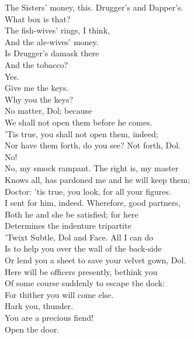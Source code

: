 \documentclass[a4paper,oneside,12pt]{memoir}
\begin{document}
\begin{drama*}
The Sisters' money, this. Drugger's and Dapper's.\\
What box is that?\\
\subtlespeaks {} The fish-wives' rings, I think,\\
And the ale-wives' money.\\
\facespeaks {} Is Drugger's damask there\\
And the tobacco?\\
\subtlespeaks {} Yes.\\
\facespeaks {} Give me the keys.\\
\dolspeaks Why you the keys?\\
\subtlespeaks {} No matter, Dol; because\\
We shall not open them before he comes.\\
\facespeaks 'Tis true, you shall not open them, indeed;\\
Nor have them forth, do you see? Not forth, Dol.\\
\dolspeaks No!\\
\facespeaks {} No, my smock rampant. The right is, my master\\
Knows all, has pardoned me and he will keep them;\\
Doctor: 'tis true, you look, for all your figures.\\
I sent for him, indeed. Wherefore, good partners,\\
Both he and she be satisfied; for here\\
Determines the indenture tripartite\\
'Twixt Subtle, Dol and Face. All I can do\\
Is to help you over the wall of the back-side\\
Or lend you a sheet to save your velvet gown, Dol.\\
Here will be officers presently, bethink you\\
Of some course suddenly to escape the dock:\\
For thither you will come else.\\
 Hark you, thunder.\\
\subtlespeaks You are a precious fiend!\\
\mammonspeaks {} Open the door.\\

\end{drama*}
\end{document}
